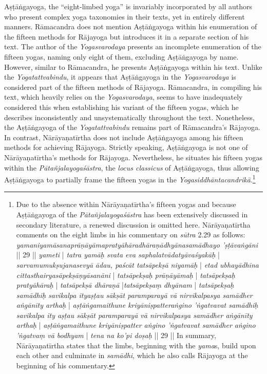 Aṣṭāṅgayoga, the ``eight-limbed yoga'' is invariably incorporated by all authors who present complex yoga taxonomies in their texts, yet in entirely different manners. Rāmacandra does not mention Aṣṭāṅgayoga within his enumeration of the fifteen methods for Rājayoga but introduces it in a separate section of his text.
The author of the \textit{Yogasvarodaya} presents an incomplete enumeration of the fifteen yogas, naming only eight of them, excluding Aṣṭāṅgayoga by name. However, similar to Rāmacandra, he presents Aṣṭāṅgayoga within his text. Unlike the \textit{Yogatattvabindu}, it appears that Aṣṭāṅgayoga in the \textit{Yogasvarodaya} is considered part of the fifteen methods of Rājayoga. Rāmacandra, in compiling his text, which heavily relies on the \textit{Yogasvarodaya}, seems to have inadequately considered this when establishing his variant of the fifteen yogas, which he describes inconsistently and unsystematically throughout the text. Nonetheless, the Aṣṭāṅgayoga of the \textit{Yogatattvabindu} remains part of Rāmacandra's Rājayoga.
In contrast, Nārāyaṇatīrtha does not include Aṣṭāṅgayoga among his fifteen methods for achieving Rājayoga. Strictly speaking, Aṣṭāṅgayoga is not one of Nārāyaṇatīrtha's methods for Rājayoga. Nevertheless, he situates his fifteen yogas within the \textit{Pātañjalayogaśāstra}, the \textit{locus classicus} of Aṣṭāṅgayoga, thus allowing Aṣṭāṅgayoga to partially frame the fifteen yogas in the \textit{Yogasiddhāntacandrikā}.\footnote{Due to the absence within Nārāyaṇatīrtha's fifteen yogas and because Aṣṭāṅgayoga of the \textit{Pātañjalayogaśāstra} has been extensively discussed in secondary literature, a renewed discussion is omitted here. Nārāyaṇatīrtha comments on the eight limbs in his commentary on \textit{sūtra} 2.29 as follows: \textit{yamaniyamāsanaprāṇāyāmapratyāhāradhāraṇādhyānasamādhayo 'ṣṭāvaṅgāni} || 29 || \textit{yameti} | \textit{tatra yamāḥ svata eva saphalatvādatyāvaśyakāḥ} | \textit{sarvamumukṣujanasevyā ādau, paścāt tatsāpekṣā niyamāḥ} | \textit{etad ubhayādhīna cittasthairyasāpekṣāṇyāsanāni} | \textit{tatsāpekṣaḥ prāṇāyāmaḥ} | \textit{tatsāpekṣaḥ pratyāhāraḥ} | \textit{tatsāpekṣā dhāraṇā} |\textit{tatsāpekṣaṃ dhyānam} | \textit{tatsāpekṣaḥ samādhiḥ savikalpa ityaṣṭau sākṣāt paramparayā vā nirvikalpasya samādher aṅgānīty arthaḥ} | \textit{aṣṭāṅgamaithune kriyāniṣpatteraṅgino 'ṅgatvavat samādhiḥ savikalpa ity aṣṭau sākṣāt paramparayā vā nirvikalpasya samādher aṅgānīty arthaḥ} | \textit{aṣṭāṅgamaithune kriyāniṣpatter aṅgino 'ṅgatvavat samādher aṅgino 'ṅgatvaṃ vā bodhyam} | \textit{tena na ko'pi doṣaḥ} || 29 || In summary, Nārāyaṇatīrtha states that the limbs, beginning with the \textit{yama}s, build upon each other and culminate in \textit{samādhi}, which he also calls Rājayoga at the beginning of his commentary.}

